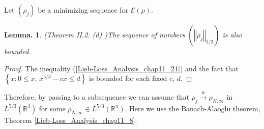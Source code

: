 \documentclass[openany, a4paper, oneside]{book}
\theoremstyle{break}
\newtheorem{lem}[thm]{Lemma.}
\theoremstyle{breakdefn}
\newcommand{\norm}[1]{\left\Vert#1\right\Vert}
\newcommand{\set}[2]{\left\{#1 : #2\right\}}
\newcommand{\bbRthree}{\mathbb{R}^3}
\newcommand{\bbRn}{\mathbb{R}^n}
\newcommand{\calE}{\mathcal{E}}
\newcommand{\rhoNinfty}{\rho_{N, \infty}}
\newcommand{\wto}{\xrightarrow{\text{w}}}
\begin{document}
Let $(\rho_j)$ be a minimizing sequence for $\calE (\rho)$.
\begin{lem}\textup{(Theorem II.2. (d) \cite{LiebSimon1})}\label{Lieb-Loss_Analysis_chap11_20}
 The sequence of numbers $(\norm{\rho_j}_{5/3})$ is also bounded.
\end{lem}
\begin{proof}
The inequality (\ref{Lieb-Loss_Analysis_chap11_21}) and the fact that $\set{x}{0 \leq x, \, x^{5/3} - cx \leq d}$ is bounded for each fixed $c$, $d$.
\end{proof}

Therefore, by passing to a subsequence we can assume that $\rho_j \wto \rhoNinfty$ in $L^{5/3} (\bbRthree)$ for some $\rhoNinfty \in L^{5/3} (\bbRn)$.
Here we use the Banach-Alaoglu theorem, Theorem \ref{Lieb-Loss_Analysis_chap11_8}.
\end{document}
